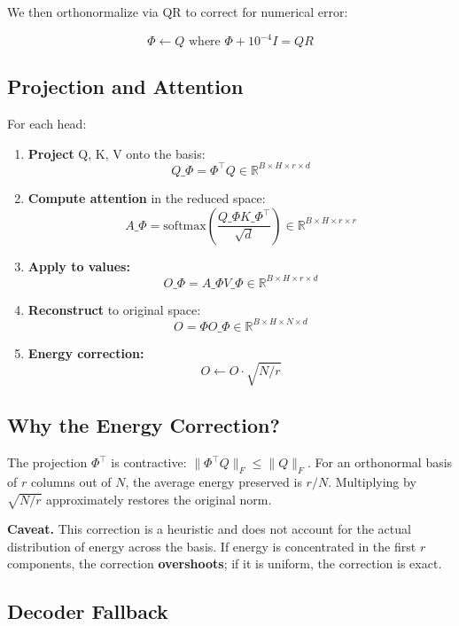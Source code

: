 We then orthonormalize via QR to correct for numerical error:

\[
\Phi \leftarrow Q \text{ where } \Phi + 10^{-4} I = Q R
\]

\subsection{Projection and Attention}

For each head:

\begin{enumerate}
\item \textbf{Project} Q, K, V onto the basis:
  \[
Q\_\Phi = \Phi^\top Q \in \mathbb{R}^{B \times H \times r \times d}
\]
  
\item \textbf{Compute attention} in the reduced space:
  \[
A\_\Phi = \mathrm{softmax}\!\left(\frac{Q\_\Phi K\_\Phi^\top}{\sqrt{d}}\right) \in \mathbb{R}^{B \times H \times r \times r}
\]
  
\item \textbf{Apply to values:}
  \[
O\_\Phi = A\_\Phi V\_\Phi \in \mathbb{R}^{B \times H \times r \times d}
\]
  
\item \textbf{Reconstruct} to original space:
  \[
O = \Phi O\_\Phi \in \mathbb{R}^{B \times H \times N \times d}
\]

\item \textbf{Energy correction:}
  \[
O \leftarrow O \cdot \sqrt{N / r}
\]

\end{enumerate}
\subsection{Why the Energy Correction?}

The projection $\Phi^\top$ is contractive: $\|\Phi^\top Q\|_F \leq \|Q\|_F$. 
For an orthonormal basis of $r$ columns out of $N$, the average energy 
preserved is $r/N$. Multiplying by $\sqrt{N/r}$ approximately restores 
the original norm.

\textbf{Caveat.} This correction is a heuristic and does not account for the 
actual distribution of energy across the basis. If energy is concentrated 
in the first $r$ components, the correction \textbf{overshoots}; if it is 
uniform, the correction is exact.

\subsection{Decoder Fallback}

